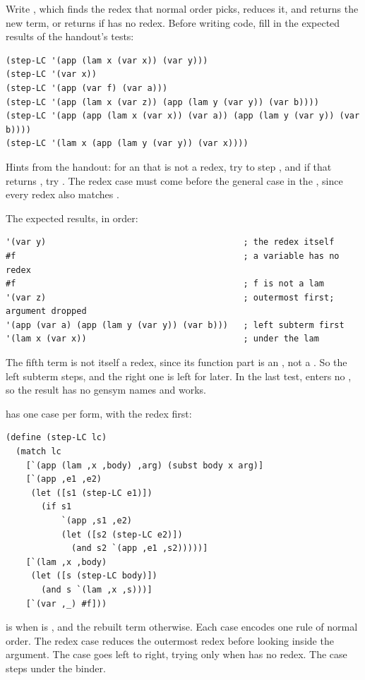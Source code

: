 \begin{exercise}
Write , which finds the redex that normal order picks, reduces it, and returns the new term, or returns  if  has no redex. Before writing code, fill in the expected results of the handout's tests:
\begin{lstlisting}
(step-LC '(app (lam x (var x)) (var y)))
(step-LC '(var x))
(step-LC '(app (var f) (var a)))
(step-LC '(app (lam x (var z)) (app (lam y (var y)) (var b))))
(step-LC '(app (app (lam x (var x)) (var a)) (app (lam y (var y)) (var b))))
(step-LC '(lam x (app (lam y (var y)) (var x))))
\end{lstlisting}
Hints from the handout: for an  that is not a redex, try to step , and if that returns , try . The redex case must come before the general  case in the , since every redex also matches .
\end{exercise}
\begin{solution}
The expected results, in order:
\begin{lstlisting}
'(var y)                                       ; the redex itself
#f                                             ; a variable has no redex
#f                                             ; f is not a lam
'(var z)                                       ; outermost first; argument dropped
'(app (var a) (app (lam y (var y)) (var b)))   ; left subterm first
'(lam x (var x))                               ; under the lam
\end{lstlisting}
The fifth term is not itself a redex, since its function part is an , not a . So the left subterm steps, and the right one is left for later. In the last test,  enters no , so the result has no gensym names and  works.

 has one case per form, with the redex first:
\begin{lstlisting}
(define (step-LC lc)
  (match lc
    [`(app (lam ,x ,body) ,arg) (subst body x arg)]
    [`(app ,e1 ,e2)
     (let ([s1 (step-LC e1)])
       (if s1
           `(app ,s1 ,e2)
           (let ([s2 (step-LC e2)])
             (and s2 `(app ,e1 ,s2)))))]
    [`(lam ,x ,body)
     (let ([s (step-LC body)])
       (and s `(lam ,x ,s)))]
    [`(var ,_) #f]))
\end{lstlisting}
 is  when  is , and the rebuilt term otherwise. Each case encodes one rule of normal order. The redex case reduces the outermost redex before looking inside the argument. The  case goes left to right, trying  only when  has no redex. The  case steps under the binder.
\end{solution}

